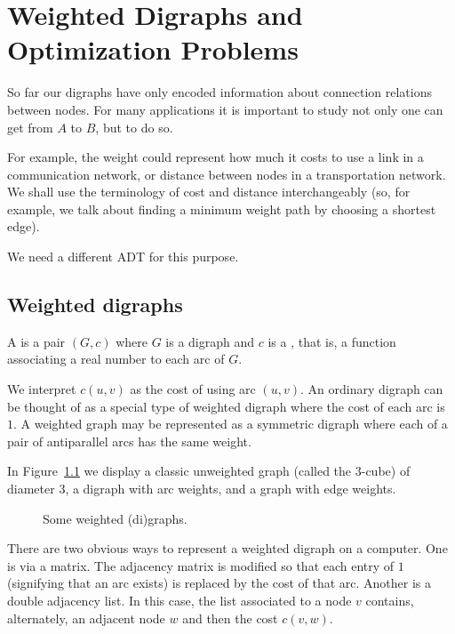 \chapter{Weighted Digraphs and Optimization Problems}
\label{ch:weighted}

So far our digraphs have only encoded information about connection
relations between nodes. For many applications it is important to study
not only  one can get from $A$ to $B$, but
 to do so.

For example, the weight could represent how much it costs to use a link
in a communication network, or distance between nodes in a
transportation network. We shall use the terminology of cost and distance
interchangeably (so, for example, we talk about finding a minimum weight
path by choosing a shortest edge).

We need a different ADT for this purpose. 

\section{Weighted digraphs}
\label{sec:weighted}

\begin{Definition}
A  is a pair $(G, c)$ where $G$ is a digraph
and $c$ is a , that is, a function associating a
real number to each arc of $G$.

\end{Definition}

We interpret $c(u, v)$ as the cost of using arc $(u, v)$. An ordinary digraph 
can be thought of as a special type of weighted digraph where the cost of each 
arc is $1$. A weighted graph may be represented as a symmetric digraph where 
each of a pair of antiparallel arcs has the same weight.

In Figure~\ref{fig:graphExample5} we display a classic unweighted graph
(called the $3$-cube) of diameter $3$, a digraph with arc weights, and a
graph with edge weights.

\begin{figure}
\centerline{}

\caption{Some weighted (di)graphs.}
\label{fig:graphExample5}
\end{figure}

There are two obvious ways to represent a weighted digraph on a
computer. One is via a matrix. The adjacency matrix is modified so that
each entry of $1$ (signifying that an arc exists) is replaced by the
cost of that arc. Another is a double adjacency list. In this case, the
list associated to a node $v$ contains, alternately, an adjacent node
$w$ and then the cost $c(v, w)$.  


